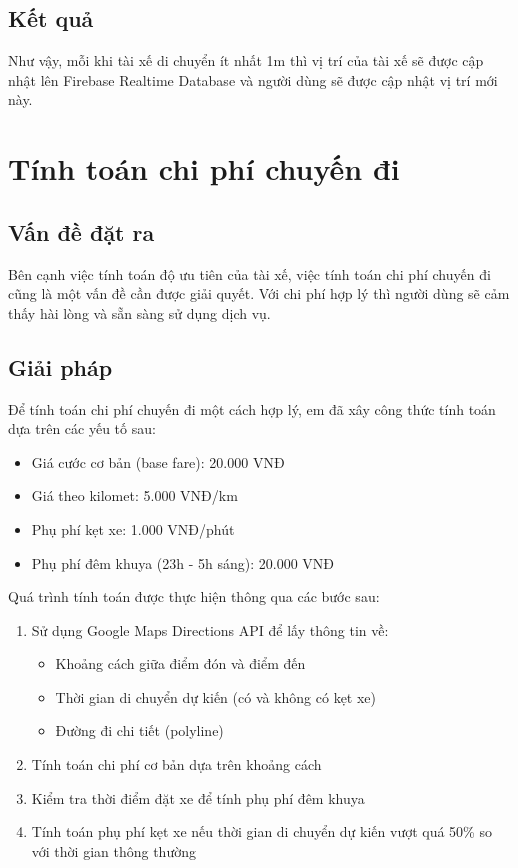 \documentclass[../DoAn.tex]{subfiles}
\begin{document}
\subsection{Kết quả}
\label{subsection:5.3.3}
Như vậy, mỗi khi tài xế di chuyển ít nhất 1m thì vị trí của tài xế sẽ được cập nhật lên Firebase Realtime Database và người dùng sẽ được cập nhật vị trí mới này.

\section{Tính toán chi phí chuyến đi}
\label{section:5.4}

\subsection{Vấn đề đặt ra}
\label{subsection:5.4.1} 
Bên cạnh việc tính toán độ ưu tiên của tài xế, việc tính toán chi phí chuyến đi cũng là một vấn đề cần được giải quyết. 
Với chi phí hợp lý thì người dùng sẽ cảm thấy hài lòng và sẵn sàng sử dụng dịch vụ.

\subsection{Giải pháp}
\label{subsection:5.4.2}
Để tính toán chi phí chuyến đi một cách hợp lý, em đã xây công thức tính toán dựa trên các yếu tố sau:
\begin{itemize}
  \item Giá cước cơ bản (base fare): 20.000 VNĐ
  \item Giá theo kilomet: 5.000 VNĐ/km
  \item Phụ phí kẹt xe: 1.000 VNĐ/phút
  \item Phụ phí đêm khuya (23h - 5h sáng): 20.000 VNĐ
\end{itemize}

Quá trình tính toán được thực hiện thông qua các bước sau:
\begin{enumerate}
  \item Sử dụng Google Maps Directions API để lấy thông tin về:
  \begin{itemize}
    \item Khoảng cách giữa điểm đón và điểm đến
    \item Thời gian di chuyển dự kiến (có và không có kẹt xe)
    \item Đường đi chi tiết (polyline)
  \end{itemize}
  \item Tính toán chi phí cơ bản dựa trên khoảng cách
  \item Kiểm tra thời điểm đặt xe để tính phụ phí đêm khuya
  \item Tính toán phụ phí kẹt xe nếu thời gian di chuyển dự kiến vượt quá 50\% so với thời gian thông thường
\end{enumerate}
\end{document}
